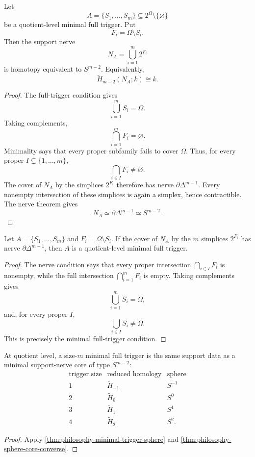 \begin{theorem}
\label{thm:philosophy-minimal-trigger-sphere}
Let
$$
  A=\{S_{1},\ldots,S_{m}\}
  \subseteq 2^{\Omega}\setminus\{\varnothing\}
$$
be a quotient-level minimal full trigger. Put
$$
  F_{i}=\Omega\setminus S_{i}.
$$
Then the support nerve
$$
  N_{A}=\bigcup_{i=1}^{m}2^{F_{i}}
$$
is homotopy equivalent to $S^{m-2}$. Equivalently,
$$
  \widetilde{H}_{m-2}(N_{A};k)\cong k.
$$
\end{theorem}
\begin{proof}
The full-trigger condition gives
$$
  \bigcup_{i=1}^{m}S_{i}=\Omega.
$$
Taking complements,
$$
  \bigcap_{i=1}^{m}F_{i}
  =
  \varnothing.
$$
Minimality says that every proper subfamily fails to cover $\Omega$.
Thus, for every proper $I\subsetneq\{1,\ldots,m\}$,
$$
  \bigcap_{i\in I}F_{i}\neq\varnothing.
$$
The cover of $N_{A}$ by the simplices $2^{F_{i}}$ therefore has nerve
$\partial\Delta^{m-1}$. Every nonempty intersection of these simplices
is again a simplex, hence contractible. The nerve theorem gives
$$
  N_{A}\simeq\partial\Delta^{m-1}\simeq S^{m-2}.
$$
\end{proof}

\begin{theorem}
\label{thm:philosophy-sphere-core-converse}
Let $A=\{S_{1},\ldots,S_{m}\}$ and $F_{i}=\Omega\setminus S_{i}$. If
the cover of $N_{A}$ by the $m$ simplices $2^{F_{i}}$ has nerve
$\partial\Delta^{m-1}$, then $A$ is a quotient-level minimal full
trigger.
\end{theorem}
\begin{proof}
The nerve condition says that every proper intersection
$\bigcap_{i\in I}F_{i}$ is nonempty, while the full intersection
$\bigcap_{i=1}^{m}F_{i}$ is empty. Taking complements gives
$$
  \bigcup_{i=1}^{m}S_{i}=\Omega,
$$
and, for every proper $I$,
$$
  \bigcup_{i\in I}S_{i}\neq\Omega.
$$
This is precisely the minimal full-trigger condition.
\end{proof}

\begin{corollary}
\label{cor:philosophy-minimal-triggers-homology-cores}
At quotient level, a size-$m$ minimal full trigger is the same support
data as a minimal support-nerve core of type $S^{m-2}$:
$$
\begin{array}{c|c|c}
  \text{trigger size} & \text{reduced homology} & \text{sphere}\\
  \hline
  1 & \widetilde{H}_{-1} & S^{-1}\\
  2 & \widetilde{H}_{0} & S^{0}\\
  3 & \widetilde{H}_{1} & S^{1}\\
  4 & \widetilde{H}_{2} & S^{2}.
\end{array}
$$
\end{corollary}
\begin{proof}
Apply
\autoref{thm:philosophy-minimal-trigger-sphere} and
\autoref{thm:philosophy-sphere-core-converse}.
\end{proof}

